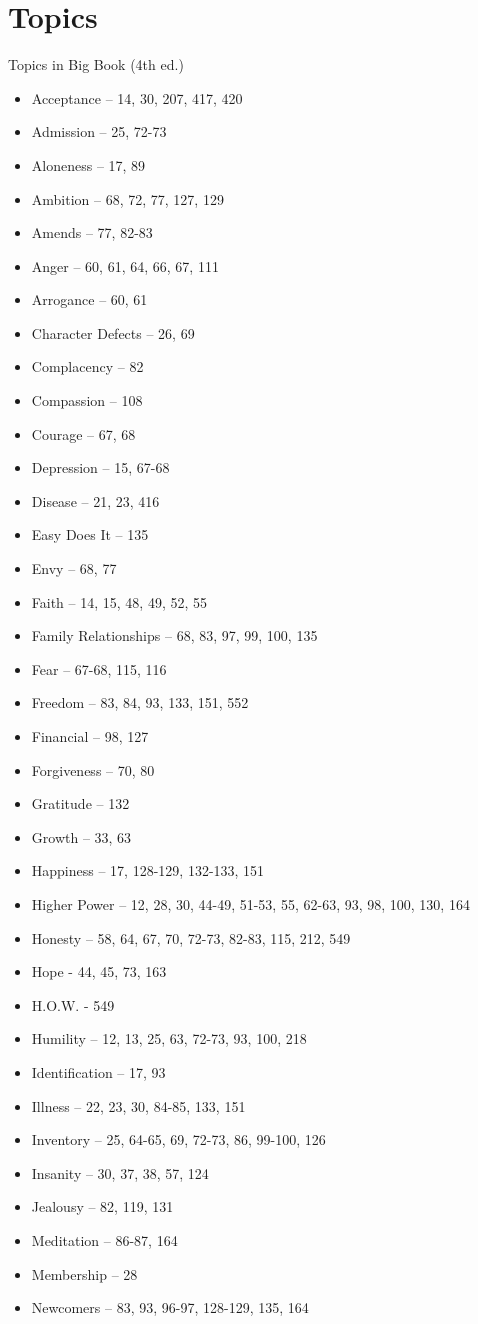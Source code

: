 \documentclass{beamer}
\begin{document}
    \section{Topics}
    \begin{frame}{Topics in Big Book (4th ed.)}
\begin{itemize}%
\item Acceptance – 14, 30, 207, 417, 420 \item Admission – 25, 72-73 \item Aloneness – 17, 89 \item Ambition – 68, 72, 77, 127, 129 \item Amends – 77, 82-83 \item Anger – 60, 61, 64, 66, 67, 111 \item Arrogance – 60, 61 \item Character Defects – 26, 69 \item Complacency – 82 \item Compassion – 108 \item Courage – 67, 68 \item Depression – 15, 67-68 \item Disease – 21, 23, 416 \item Easy Does It –  135 \item Envy – 68, 77 \item Faith – 14, 15, 48, 49, 52, 55\item Family Relationships – 68, 83, 97, 99, 100, 135\item Fear – 67-68, 115, 116 \item Freedom – 83, 84, 93, 133, 151, 552\item Financial – 98, 127\item Forgiveness – 70, 80 \item Gratitude – 132 \item Growth – 33, 63 \item Happiness – 17, 128-129, 132-133, 151\item Higher Power – 12, 28, 30, 44-49, 51-53, 55, 62-63, 93, 98, 100, 130, 164\item Honesty – 58, 64, 67, 70, 72-73, 82-83, 115, 212, 549\item Hope - 44, 45, 73, 163\item H.O.W. - 549\item Humility – 12, 13, 25, 63, 72-73, 93, 100, 218 \item Identification – 17, 93\item Illness – 22, 23, 30, 84-85, 133, 151\item Inventory – 25, 64-65, 69, 72-73, 86, 99-100, 126\item Insanity – 30, 37, 38, 57, 124\item Jealousy – 82, 119, 131\item Meditation – 86-87, 164\item Membership – 28\item Newcomers – 83, 93, 96-97, 128-129, 135, 164 

\end{itemize}
\end{frame}
\end{document}
